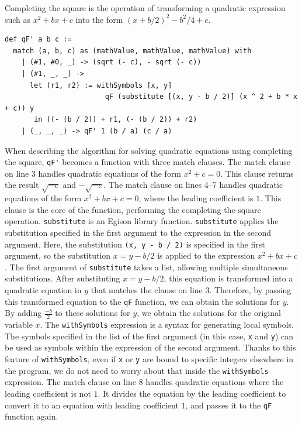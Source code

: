 Completing the square is the operation of transforming a quadratic expression such as $x^2 + b x + c$ into the form $(x + b / 2)^2 - b^2 / 4 + c$.
\begin{lstlisting}[language=egison]
def qF' a b c :=
  match (a, b, c) as (mathValue, mathValue, mathValue) with
    | (#1, #0, _) -> (sqrt (- c), - sqrt (- c))
    | (#1, _, _) ->
      let (r1, r2) := withSymbols [x, y]
                        qF (substitute [(x, y - b / 2)] (x ^ 2 + b * x + c)) y
       in ((- (b / 2)) + r1, (- (b / 2)) + r2)
    | (_, _, _) -> qF' 1 (b / a) (c / a)
\end{lstlisting}
When describing the algorithm for solving quadratic equations using completing the square, \lstinline{qF'} becomes a function with three match clauses.
The match clause on line 3 handles quadratic equations of the form $x^2 + c = 0$.
This clause returns the result $\sqrt{-c}$ and $-\sqrt{-c}$.
The match clause on lines 4--7 handles quadratic equations of the form $x^2 + b x + c = 0$, where the leading coefficient is $1$.
This clause is the core of the function, performing the completing-the-square operation.
\lstinline{substitute} is an Egison library function.
\lstinline{substitute} applies the substitution specified in the first argument to the expression in the second argument.
Here, the substitution \lstinline{(x, y - b / 2)} is specified in the first argument, so the substitution $x = y - b / 2$ is applied to the expression $x^2 + b x + c$.
The first argument of \lstinline{substitute} takes a list, allowing multiple simultaneous substitutions.
After substituting $x = y - b / 2$, this equation is transformed into a quadratic equation in $y$ that matches the clause on line 3.
Therefore, by passing this transformed equation to the \lstinline{qF} function, we can obtain the solutions for $y$.
By adding $\frac{-b}{2}$ to these solutions for $y$, we obtain the solutions for the original variable $x$.
The \lstinline{withSymbols} expression is a syntax for generating local symbols.
The symbols specified in the list of the first argument (in this case, \lstinline{x} and \lstinline{y}) can be used as symbols within the expression of the second argument.
Thanks to this feature of \lstinline{withSymbols}, even if \lstinline{x} or \lstinline{y} are bound to specific integers elsewhere in the program, we do not need to worry about that inside the \lstinline{withSymbols} expression.
The match clause on line 8 handles quadratic equations where the leading coefficient is not $1$.
It divides the equation by the leading coefficient to convert it to an equation with leading coefficient $1$, and passes it to the \lstinline{qF} function again.

